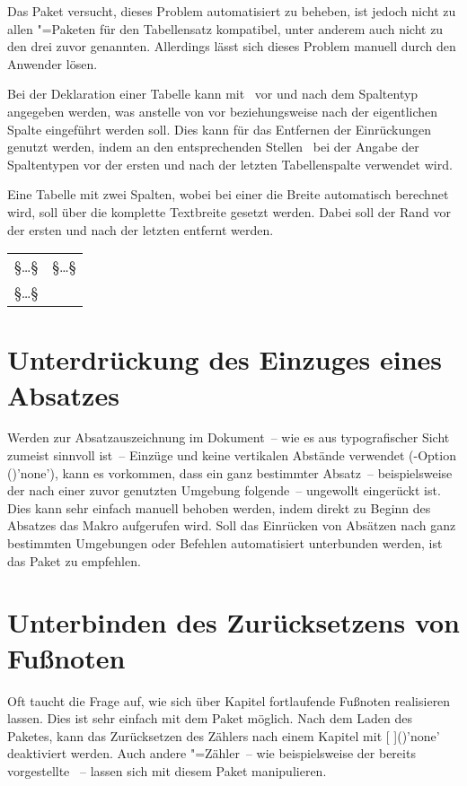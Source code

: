 Das Paket  versucht, dieses Problem automatisiert zu 
beheben, ist jedoch nicht zu allen "=Paketen für den 
Tabellensatz kompatibel, unter anderem auch nicht zu den drei zuvor genannten. 
Allerdings lässt sich dieses Problem manuell durch den Anwender lösen. 

Bei der Deklaration einer Tabelle kann mit~\PParameter{\dots} vor und 
nach dem Spaltentyp angegeben werden, was anstelle von  vor 
beziehungsweise nach der eigentlichen Spalte eingeführt werden soll. Dies kann 
für das Entfernen der Einrückungen genutzt werden, indem an den entsprechenden 
Stellen~ bei der Angabe der Spaltentypen vor der ersten 
und nach der letzten Tabellenspalte verwendet wird.
%
\begin{Example}
Eine Tabelle mit zwei Spalten, wobei bei einer die Breite automatisch berechnet 
wird, soll über die komplette Textbreite gesetzt werden. Dabei soll der Rand 
vor der ersten und nach der letzten entfernt werden.
\begin{Code}[escapechar=§]
\begin{tabularx}{\textwidth}{@{}lX@{}}
§\dots§ & §\dots§ \tabularnewline
§\dots§
\end{tabularx}
\end{Code}
\end{Example}




\section{Unterdrückung des Einzuges eines Absatzes}
%
%
Werden zur Absatzauszeichnung im Dokument~-- wie es aus typografischer Sicht 
zumeist sinnvoll ist~-- Einzüge und keine vertikalen Abstände verwendet
(\KOMAScript-Option ()'none'), kann 
es vorkommen, dass ein ganz bestimmter Absatz~-- beispielsweise der nach einer 
zuvor genutzten Umgebung folgende~-- ungewollt eingerückt ist. Dies kann sehr 
einfach manuell behoben werden, indem direkt zu Beginn des Absatzes das Makro 
 aufgerufen wird. Soll das Einrücken von Absätzen nach ganz 
bestimmten Umgebungen oder Befehlen automatisiert unterbunden werden, ist das 
Paket  zu empfehlen.



\section{Unterbinden des Zurücksetzens von Fußnoten}%
%
%
%
Oft taucht die Frage auf, wie sich über Kapitel fortlaufende Fußnoten 
realisieren lassen. Dies ist sehr einfach mit dem Paket  
möglich. Nach dem Laden des Paketes, kann das Zurücksetzen des Zählers nach 
einem Kapitel mit [%
]()'none' deaktiviert werden. Auch andere 
"=Zähler~-- wie beispielsweise der bereits vorgestellte 
~-- lassen sich mit diesem Paket manipulieren.



